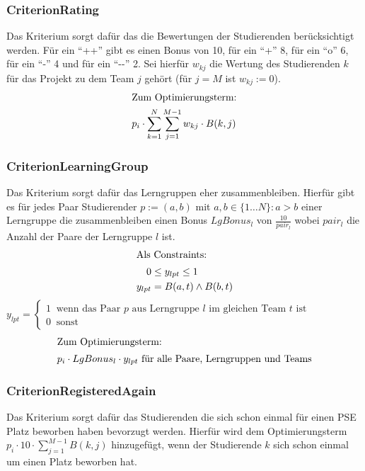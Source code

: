 \documentclass[parskip=full]{scrartcl}
\begin{document}
\subsubsection{CriterionRating}
Das Kriterium sorgt dafür das die Bewertungen der Studierenden berücksichtigt
werden. Für ein \enquote{++} gibt es einen Bonus von 10, für ein \enquote{+} 8,
für ein \enquote{o} 6, für ein \enquote{-} 4 und für ein \enquote{-{}-} 2. Sei
hierfür $w_{kj}$ die Wertung des Studierenden $k$ für das Projekt zu dem Team
$j$ gehört (für $j = M$ ist $w_{kj} := 0$).
\begin{align*}
\intertext{Zum Optimierungsterm:}
p_i \cdot \sum_{k=1}^{N}\sum_{j=1}^{M-1}w_{kj} \cdot B(k,j)
\end{align*}

\subsubsection{CriterionLearningGroup}
Das Kriterium sorgt dafür das Lerngruppen eher zusammenbleiben. Hierfür gibt es
für jedes Paar Studierender $p:= (a,b)$ mit $a,b \in \{ 1\ldots N\}: a > b$
einer Lerngruppe die zusammenbleiben einen Bonus $LgBonus_l$ von $\frac{10}{pair_l}$ wobei $pair_l$ die Anzahl der Paare der
Lerngruppe $l$ ist.
\begin{align*}
\intertext{Als Constraints: }
0 &\le y_{lpt} \le 1  \\
y_{lpt} &= B(a,t) \wedge B(b,t)
\end{align*}
$y_{lpt} =\begin{cases}
1 \;\; \text{wenn das Paar $p$ aus
Lerngruppe $l$ im  gleichen Team $t$ ist} \\
0 \;\;\text{sonst}
\end{cases}$
\begin{align*}
\intertext{Zum Optimierungsterm: } 
p_i \cdot LgBonus_l \cdot y_{lpt} \text{ für alle Paare, Lerngruppen und Teams}
\end{align*} 

\subsubsection{CriterionRegisteredAgain}
Das Kriterium sorgt dafür das Studierenden die sich schon einmal für einen PSE
Platz beworben haben bevorzugt werden. Hierfür wird dem Optimierungsterm
$p_i \cdot 10 \cdot \sum_{j = 1}^{M-1} B(k,j)$ hinzugefügt, wenn der
Studierende $k$ sich schon einmal um einen Platz beworben hat.
\end{document}
